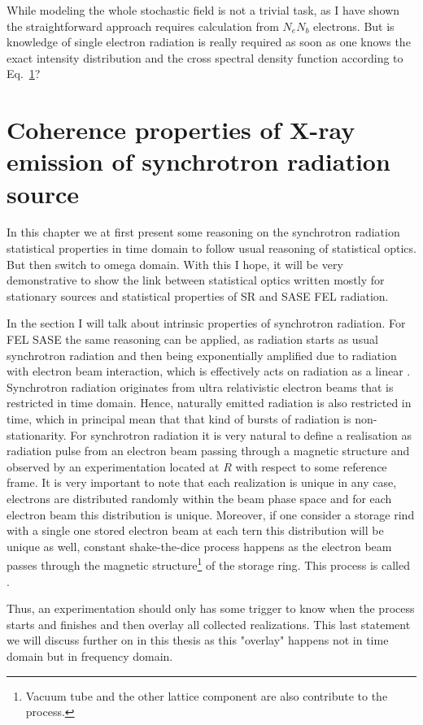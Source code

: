     While modeling the whole stochastic field is not a trivial task, as I have shown the straightforward approach requires calculation from $N_eN_b$ electrons. But is knowledge of single electron radiation is really required as soon as one knows the exact intensity distribution and the cross spectral density function according to Eq.~\ref{}? 

\section{Coherence properties of X-ray emission of synchrotron radiation source}
In this chapter we at first present some reasoning on the synchrotron radiation statistical properties in time domain to follow usual reasoning of statistical optics. But then switch to omega domain. With this I hope, it will be very demonstrative to show the link between statistical optics written mostly for stationary sources and statistical properties of SR and SASE FEL radiation.
    
    In the section I will talk about intrinsic properties of synchrotron radiation. For FEL SASE the same reasoning can be applied, as radiation starts as usual synchrotron radiation and then being exponentially amplified due to radiation with electron beam interaction, which is effectively acts on radiation as a linear  . Synchrotron radiation originates from ultra relativistic electron beams that is restricted in time domain. Hence, naturally emitted radiation is also restricted in time, which in principal mean that that kind of bursts of radiation is non-stationarity. For synchrotron radiation it is very natural to define a realisation as radiation pulse from an electron beam passing through a magnetic structure and observed by an experimentation located at $R$ with respect to some reference frame. It is very important to note that each realization is unique in any case, electrons are distributed randomly within the beam phase space and for each electron beam this distribution is unique. Moreover, if one consider a storage rind with a single one stored electron beam at each tern this distribution will be unique as well, constant shake-the-dice process happens as the electron beam passes through the magnetic structure\footnote{Vacuum tube and the other lattice component are also contribute to the process.} of the storage ring. This process is called . 
    
    Thus, an experimentation should only has some trigger to know when the process starts and finishes and then overlay all collected realizations. This last statement we will discuss further on  in this thesis as this "overlay" happens not in time domain but in frequency domain.
    
